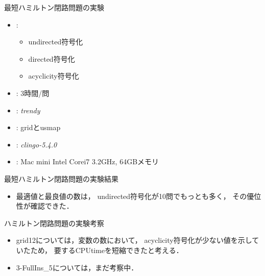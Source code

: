 \documentclass[dvipdfmx,11pt]{beamer}
\begin{document}
\begin{frame}[noframenumbering]{最短ハミルトン閉路問題の実験}
  \begin{itemize}
  \item {}:
    \begin{itemize}
    \item \textsf{undirected}符号化
    \item \textsf{directed}符号化
    \item \textsf{acyclicity}符号化
    \end{itemize}
  \item {}: 3時間/問
  \item {}: \textit{trendy}
  \item {}: \textsf{grid}と\textsf{usmap}
  \item {}: \textit{clingo-5.4.0}
  \item {}: Mac mini Intel Corei7 3.2GHz, 64GBメモリ
  \end{itemize}
\end{frame}

\begin{frame}[noframenumbering]{最短ハミルトン閉路問題の実験結果}

\begin{itemize}
\item 最適値と最良値の数は，
\textsf{undirected}符号化が10問でもっとも多く，
その優位性が確認できた．
\end{itemize}
    
\end{frame}

\begin{frame}[noframenumbering]{ハミルトン閉路問題の実験考察}


\begin{itemize}
\item \textsf{grid12}については，変数の数において，
  \textsf{acyclicity}符号化が少ない値を示していたため，
  要するCPUtimeを短縮できたと考える．
\item \textsf{3-FullIns\_5}については，まだ考察中．
\end{itemize}
\end{frame}
\end{document}
